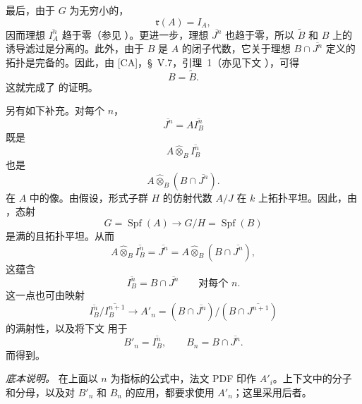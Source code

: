 最后，由于 \(G\) 为无穷小的，
\[
  \mathfrak r(A)=I_A,
\]
因而理想 \(\overline{I_A^n}\) 趋于零\textup{（参见 ）}。更进一步，理想 \(\overline{J^n}\) 也趋于零，所以 \(\widetilde B\) 和 \(B\) 上的诱导滤过是分离的。此外，由于 \(B\) 是 \(A\) 的闭子代数，它关于理想 \(B\cap\overline{J^n}\) 定义的拓扑是完备的。因此，由 \textup{[CA]}，\S~V.7，引理~1\textup{（亦见下文 ）}，可得
\[
  B=\widetilde B.
\]
这就完成了  的证明。

另有如下补充。对每个 \(n\)，
\[
  \overline{J^n}=A\overline{I_B^n}
\]
既是
\[
  A\widehat\otimes_B\overline{I_B^n}
\]
也是
\[
  A\widehat\otimes_B(B\cap\overline{J^n}).
\]
在 \(A\) 中的像。由假设，形式子群 \(H\) 的仿射代数 \(A/J\) 在 \(k\) 上拓扑平坦。因此，由 ，态射
\[
  G=\operatorname{Spf}(A)
  \longrightarrow
  G/H=\operatorname{Spf}(B)
\]
是满的且拓扑平坦。从而
\[
  A\widehat\otimes_B\overline{I_B^n}
  =
  \overline{J^n}
  =
  A\widehat\otimes_B(B\cap\overline{J^n}),
\]
这蕴含
\[
  \overline{I_B^n}=B\cap\overline{J^n}
  \qquad\text{对每个 }n.
\]
这一点也可由映射
\[
  \overline{I_B^n}/\overline{I_B^{n+1}}
  \longrightarrow
  A'_n
  =
  (B\cap\overline{J^n})/
  (B\cap\overline{J^{n+1}})
\]
的满射性，以及将下文 \textup{} 用于
\[
  B'_n=\overline{I_B^n},
  \qquad
  B_n=B\cap\overline{J^n}.
\]
而得到。

\label{sga3:VIIB:5.1.4:supplement-index-source-note}
\noindent\textit{底本说明。}\enspace
在上面以 \(n\) 为指标的公式中，法文 PDF 印作 \(A'_i\)。上下文中的分子和分母，以及对 \(B'_n\) 和 \(B_n\) 的应用，都要求使用 \(A'_n\)；这里采用后者。
